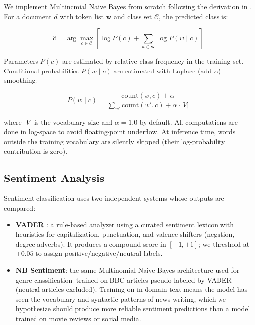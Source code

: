 We implement Multinomial Naive Bayes from scratch following the derivation in \citet{mccallum1998comparison}. For a document $d$ with token list $\mathbf{w}$ and class set $\mathcal{C}$, the predicted class is:

\[
\hat{c} = \arg\max_{c \in \mathcal{C}} \left[ \log P(c) + \sum_{w \in \mathbf{w}} \log P(w \mid c) \right]
\]

Parameters $P(c)$ are estimated by relative class frequency in the training set. Conditional probabilities $P(w \mid c)$ are estimated with Laplace (add-$\alpha$) smoothing:

\[
P(w \mid c) = \frac{\text{count}(w, c) + \alpha}{\sum_{w'} \text{count}(w', c) + \alpha \cdot |V|}
\]

where $|V|$ is the vocabulary size and $\alpha = 1.0$ by default. All computations are done in log-space to avoid floating-point underflow. At inference time, words outside the training vocabulary are silently skipped (their log-probability contribution is zero).

\subsection{Sentiment Analysis}

Sentiment classification uses two independent systems whose outputs are compared:

\begin{itemize}
    \item \textbf{VADER} \cite{hutto2014vader}: a rule-based analyzer using a curated sentiment lexicon with heuristics for capitalization, punctuation, and valence shifters (negation, degree adverbs). It produces a compound score in $[-1, +1]$; we threshold at $\pm 0.05$ to assign positive/negative/neutral labels.

    \item \textbf{NB Sentiment}: the same Multinomial Naive Bayes architecture used for genre classification, trained on BBC articles pseudo-labeled by VADER (neutral articles excluded). Training on in-domain text means the model has seen the vocabulary and syntactic patterns of news writing, which we hypothesize should produce more reliable sentiment predictions than a model trained on movie reviews or social media.
\end{itemize}


